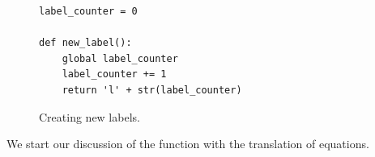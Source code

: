 \begin{figure}[!ht]
\centering
\begin{verbatim}
label_counter = 0

def new_label():
    global label_counter
    label_counter += 1
    return 'l' + str(label_counter)
\end{verbatim}
\vspace*{-0.3cm}
\caption{Creating new labels.}
\label{fig:Compiler.ipynb:new_label}
\end{figure}

\noindent
We start our discussion of the function  with the translation of equations.

